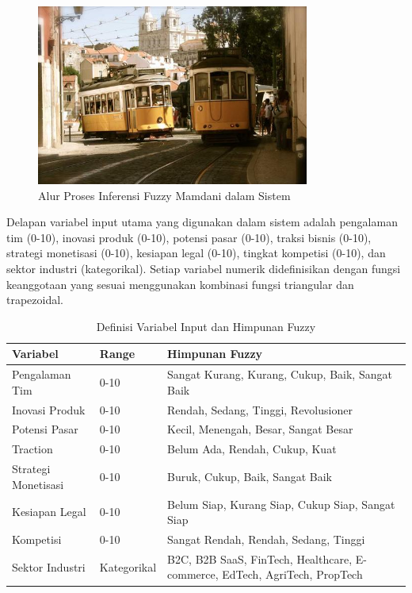 \documentclass[12pt,a4paper]{article}
\begin{document}
\begin{figure}[H]
    \centering
    \includegraphics[width=0.8\textwidth]{assets/image.png}
    \caption{Alur Proses Inferensi Fuzzy Mamdani dalam Sistem}
    \label{fig:fuzzy-flow}
\end{figure}

Delapan variabel input utama yang digunakan dalam sistem adalah pengalaman tim (0-10), inovasi produk (0-10), potensi pasar (0-10), traksi bisnis (0-10), strategi monetisasi (0-10), kesiapan legal (0-10), tingkat kompetisi (0-10), dan sektor industri (kategorikal). Setiap variabel numerik didefinisikan dengan fungsi keanggotaan yang sesuai menggunakan kombinasi fungsi triangular dan trapezoidal.

\begin{table}[H]
\centering
\caption{Definisi Variabel Input dan Himpunan Fuzzy}
\label{tab:variables}
\begin{tabular}{@{}lll@{}}
\toprule
\textbf{Variabel} & \textbf{Range} & \textbf{Himpunan Fuzzy} \\
\midrule
Pengalaman Tim & 0-10 & Sangat Kurang, Kurang, Cukup, Baik, Sangat Baik \\
Inovasi Produk & 0-10 & Rendah, Sedang, Tinggi, Revolusioner \\
Potensi Pasar & 0-10 & Kecil, Menengah, Besar, Sangat Besar \\
Traction & 0-10 & Belum Ada, Rendah, Cukup, Kuat \\
Strategi Monetisasi & 0-10 & Buruk, Cukup, Baik, Sangat Baik \\
Kesiapan Legal & 0-10 & Belum Siap, Kurang Siap, Cukup Siap, Sangat Siap \\
Kompetisi & 0-10 & Sangat Rendah, Rendah, Sedang, Tinggi \\
Sektor Industri & Kategorikal & B2C, B2B SaaS, FinTech, Healthcare, E-commerce, EdTech, AgriTech, PropTech \\
\bottomrule
\end{tabular}
\end{table}
\end{document}
